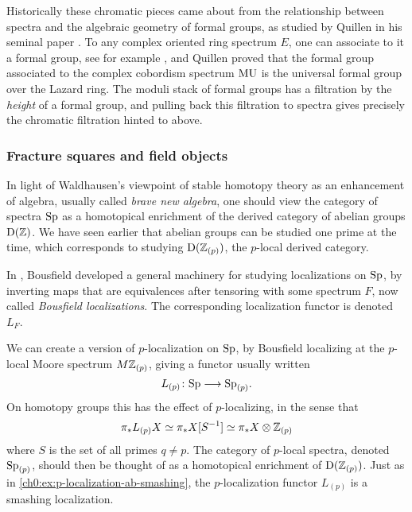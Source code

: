 \begin{remark}
    \label{ch0:rm:quillen-formal-groups}
    Historically these chromatic pieces came about from the relationship between spectra and the algebraic geometry of formal groups, as studied by Quillen in his seminal paper \cite{quillen_1969}. To any complex oriented ring spectrum $E$, one can associate to it a formal group, see for example \cite[Appendix 2]{ravenel_86}, and Quillen proved that the formal group associated to the complex cobordism spectrum $\mathrm{MU}$ is the universal formal group over the Lazard ring. The moduli stack of formal groups has a filtration by the \emph{height} of a formal group, and pulling back this filtration to spectra gives precisely the chromatic filtration hinted to above. 
\end{remark}

\subsubsection{Fracture squares and field objects}
\label{ch0:sssec:fracture-squares}

In light of Waldhausen's viewpoint of stable homotopy theory as an enhancement of algebra, usually called \emph{brave new algebra}, one should view the category of spectra $\mathrm{Sp}$ as a homotopical enrichment of the derived category of abelian groups $\mathrm{D}(\mathbb{Z})$. We have seen earlier that abelian groups can be studied one prime at the time, which corresponds to studying $\mathrm{D}(\mathbb{Z}_{(p)})$, the $p$-local derived category. 

In \cite{bousfield_1979_localization}, Bousfield developed a general machinery for studying localizations on $\mathrm{Sp}$, by inverting maps that are equivalences after tensoring with some spectrum $F$, now called \emph{Bousfield localizations}. The corresponding localization functor is denoted $L_F$. 

\begin{example}
    We can create a version of $p$-localization on $\mathrm{Sp}$, by Bousfield localizing at the $p$-local Moore spectrum $M\mathbb{Z}_{(p)}$, giving a functor usually written 
    \[L_{(p)} \colon\mathrm{Sp} \longrightarrow \mathrm{Sp}_{(p)}.\] 
    On homotopy groups this has the effect of $p$-localizing, in the sense that 
    \[\pi_* L_{(p)}X \simeq \pi_* X [S^{-1}]\simeq \pi_* X \otimes \mathbb{Z}_{(p)}\]
    where $S$ is the set of all primes $q\neq p$. The category of $p$-local spectra, denoted $\mathrm{Sp}_{(p)}$, should then be thought of as a homotopical enrichment of $\mathrm{D}(\mathbb{Z}_{(p)})$. Just as in \cref{ch0:ex:p-localization-ab-smashing}, the $p$-localization functor $L_{(p)}$ is a smashing localization. 
\end{example}


